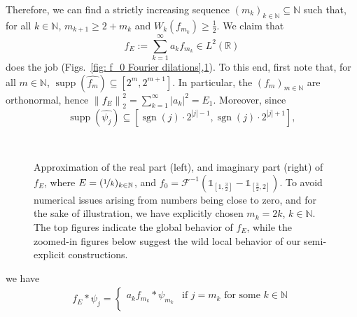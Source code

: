 \documentclass[11pt]{amsart}
\newcommand{\R}{{\mathbb{R}}}
\newcommand{\N}{\mathbb{N}}
\newcommand{\norm}[1]{\ensuremath{\left\lVert\text{}#1\text{}\right\rVert}}
\DeclareMathOperator{\sgn}{sgn}
\DeclareMathOperator{\supp}{supp}
\newenvironment{proof sketch} {\textit{Proof sketch.}}{}
\begin{document}
\begin{proof sketch}
  Therefore, we can find a strictly increasing sequence $(m_k)_{k \in \N} \subseteq \N$ such that, for all $k \in \N$, $m_{k+1}\geq 2+m_{k}$ and $W_k(f_{m_k})\geq \frac{1}{2}$. We claim that 
  \[f_E:=\sum_{k=1}^\infty a_k f_{m_k} \in L^2(\R)\]
  does the job (Figs.~\ref{fig: f_0 Fourier dilations},\ref{fig: illustr of proof principle}). To this end, first note that, for all $m \in \N$, $\supp(\widehat{f_m})\subseteq [2^m,2^{m+1}]$. In particular, the $(f_m)_{m \in \N}$ are orthonormal, hence $\norm{f_E}_2^2=\sum_{k=1}^\infty |a_k|^2=E_1$. Moreover, since 
  \[\supp(\widehat{\psi_j})\subseteq [\sgn(j)\cdot 2^{|j|-1},\sgn(j)\cdot 2^{|j|+1}],\] 
   \begin{figure}[h!]
  	\centering
  	\begin{minipage}{0.499\textwidth}
  		\centering
  		\resizebox{0.999\textwidth}{!}{} 
  	\end{minipage}\hfill
  	\begin{minipage}{0.499\textwidth}
  		\centering
  		\resizebox{0.999\textwidth}{!}{}
  	\end{minipage}
  	\\
  	\begin{minipage}{0.499\textwidth}
  		\centering
  		\resizebox{0.999\textwidth}{!}{} 
  	\end{minipage}\hfill
  	\begin{minipage}{0.499\textwidth}
  		\centering
  		\resizebox{0.999\textwidth}{!}{}
  	\end{minipage}
  	\captionsetup{width=0.9\linewidth}
  	\caption{Approximation of the real part (left), and imaginary part (right) of $f_E$, where $E=(\nicefrac{1}{k})_{k\in \N}$, and $f_0=\mathcal{F}^{-1}(\mathds{1}_{[1,\frac{3}{2}]}-\mathds{1}_{[\frac{3}{2},2]})$. To avoid numerical issues arising from numbers being close to zero, and for the sake of illustration, we have explicitly chosen $m_k=2k$, $k \in \N$. The top figures indicate the global behavior of $f_E$, while the zoomed-in figures below suggest the wild local behavior of our semi-explicit constructions.}\label{fig: illustr of proof principle}
  \end{figure}
  we have
  \begin{align*}
    f_E*\psi_j=
    \begin{cases}
      a_k f_{m_k}*\psi_{m_k} & \text{if } j=m_k \text{ for some } k \in \N \\

\end{cases}
\end{align*}
\end{proof sketch}
\end{document}
